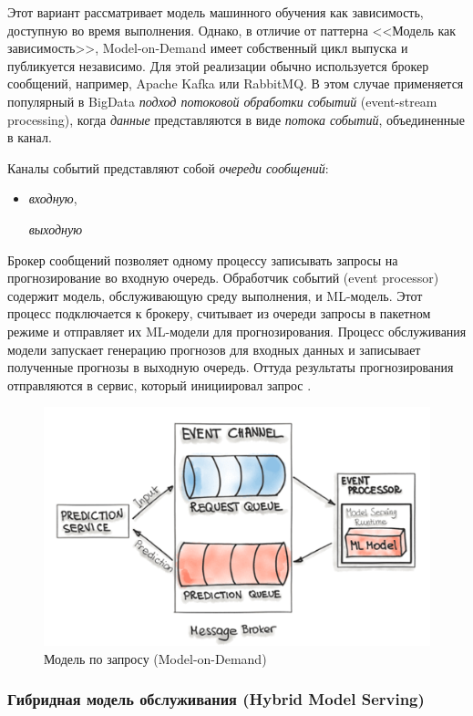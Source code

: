 \documentclass[%
	11pt,
	a4paper,
	utf8,
		]{article}
\begin{document}
Этот вариант рассматривает модель машинного обучения как зависимость, доступную во время выполнения. Однако, в отличие от паттерна <<Модель как зависимость>>, Model-on-Demand имеет собственный цикл выпуска и публикуется независимо. Для этой реализации обычно используется брокер сообщений, например, Apache Kafka или RabbitMQ. В этом случае применяется популярный в BigData \emph{подход потоковой обработки событий} (event-stream processing), когда \emph{данные} представляются в виде \emph{потока событий}, объединенные в канал.

Каналы событий представляют собой \emph{очереди сообщений}:
\begin{itemize}
	\item \emph{входную},
	
	\emph{выходную}
\end{itemize}

Брокер сообщений позволяет одному процессу записывать запросы на прогнозирование во входную очередь. Обработчик событий (event processor) содержит модель, обслуживающую среду выполнения, и ML-модель. Этот процесс подключается к брокеру, считывает из очереди запросы в пакетном режиме и отправляет их ML-модели для прогнозирования. Процесс обслуживания модели запускает генерацию прогнозов для входных данных и записывает полученные прогнозы в выходную очередь. Оттуда результаты прогнозирования отправляются в сервис, который инициировал запрос .

 \begin{figure}[h]
	\centering
	\includegraphics[scale=0.6]{figures/model_on_demand.png}
	\caption{ Модель по запросу (Model-on-Demand) }\label{fig:model_on_demand}
\end{figure}

\subsubsection{Гибридная модель обслуживания (Hybrid Model Serving)}
\end{document}
